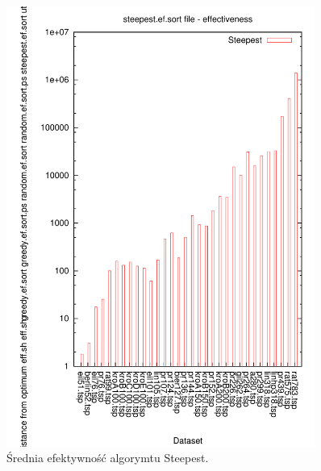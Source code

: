 \begin{figure}
\begin{center}
\includegraphics[width=0.9\textwidth]{wykresy/steepest_ef}
\end{center}
\caption{Średnia efektywność algorymtu Steepest.}
\label{steepest_ef}
\end{figure}


